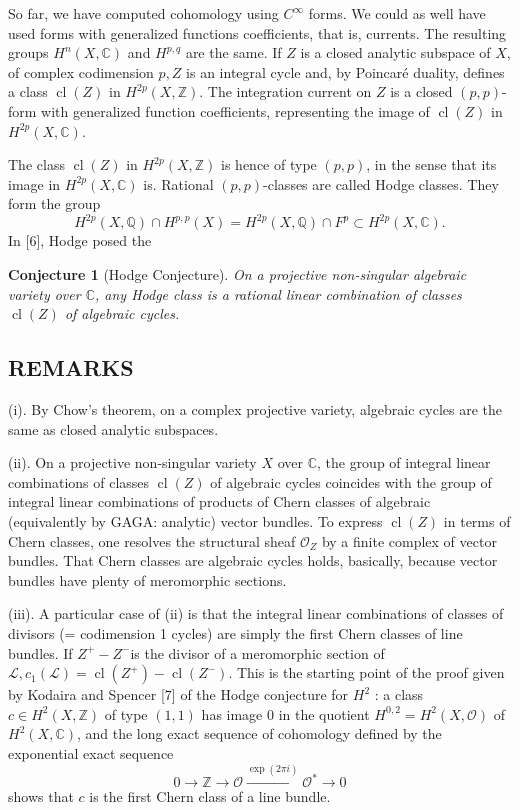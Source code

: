 \documentclass[12pt,twoside]{book}
\theoremstyle{plain}
\newtheorem{conjecture}[conjecture]{Conjecture}
\theoremstyle{definition}
\theoremstyle{remark}
\numberwithin{equation}{section}
\begin{document}
So far, we have computed cohomology using $C^{\infty}$ forms. We could as well have used forms with generalized functions coefficients, that is, currents. The resulting groups $H^n(X, \mathbb{C})$ and $H^{p, q}$ are the same. If $Z$ is a closed analytic subspace of $X$, of complex codimension $p, Z$ is an integral cycle and, by Poincaré duality, defines a class $\operatorname{cl}(Z)$ in $H^{2 p}(X, \mathbb{Z})$. The integration current on $Z$ is a closed $(p, p)$-form with generalized function coefficients, representing the image of $\operatorname{cl}(Z)$ in $H^{2 p}(X, \mathbb{C})$.

The class $\operatorname{cl}(Z)$ in $H^{2 p}(X, \mathbb{Z})$ is hence of type $(p, p)$, in the sense that its image in $H^{2 p}(X, \mathbb{C})$ is. Rational $(p, p)$-classes are called Hodge classes. They form the group
$$
H^{2 p}(X, \mathbb{Q}) \cap H^{p, p}(X)=H^{2 p}(X, \mathbb{Q}) \cap F^p \subset H^{2 p}(X, \mathbb{C}) .
$$
In [6], Hodge posed the
\begin{conjecture}[Hodge Conjecture]
  On a projective non-singular algebraic variety over $\mathbb{C}$, any Hodge class is a rational linear combination of classes $\operatorname{cl}(Z)$ of algebraic cycles.
\end{conjecture}
\subsection{REMARKS}
(i).  By Chow's theorem, on a complex projective variety, algebraic cycles are the same as closed analytic subspaces.

(ii).  On a projective non-singular variety $X$ over $\mathbb{C}$, the group of integral linear combinations of classes $\operatorname{cl}(Z)$ of algebraic cycles coincides with the group of integral linear combinations of products of Chern classes of algebraic (equivalently by GAGA: analytic) vector bundles. To express $\operatorname{cl}(Z)$ in terms of Chern classes, one resolves the structural sheaf $\mathcal{O}_Z$ by a finite complex of vector bundles. That Chern classes are algebraic cycles holds, basically, because vector bundles have plenty of meromorphic sections.

(iii).  A particular case of (ii) is that the integral linear combinations of classes of divisors (= codimension 1 cycles) are simply the first Chern classes of line bundles. If $Z^{+}-Z^{-}$is the divisor of a meromorphic section of $\mathcal{L}, c_1(\mathcal{L})=\operatorname{cl}\left(Z^{+}\right)-\operatorname{cl}\left(Z^{-}\right)$. This is the starting point of the proof given by Kodaira and Spencer [7] of the Hodge conjecture for $H^2$ : a class $c \in H^2(X, \mathbb{Z})$ of type $(1,1)$ has image 0 in the quotient $H^{0,2}=H^2(X, \mathcal{O})$ of $H^2(X, \mathbb{C})$, and the long exact sequence of cohomology defined by the exponential exact sequence
$$
0 \longrightarrow \mathbb{Z} \longrightarrow \mathcal{O} \stackrel{\exp (2 \pi i)}{\longrightarrow} \mathcal{O}^* \longrightarrow 0
$$
shows that $c$ is the first Chern class of a line bundle.
\end{document}
